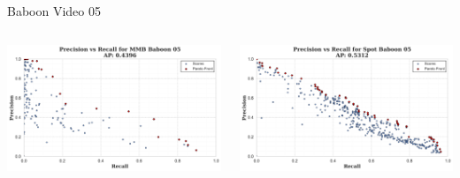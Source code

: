 \begin{frame}{Baboon Video 05}
    \begin{columns}
        \begin{column}{0.48\textwidth}
            \centering
            \includegraphics[width=\textwidth,height=0.7\textheight,keepaspectratio]{images/bom/precision_recall_MMB_Baboon_05.png}
        \end{column}
        \begin{column}{0.48\textwidth}
            \centering
            \includegraphics[width=\textwidth,height=0.7\textheight,keepaspectratio]{images/bom/precision_recall_Spot_Baboon_05.png}
        \end{column}
    \end{columns}
\end{frame}
